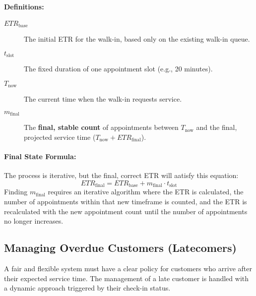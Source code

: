 \documentclass{article}
\begin{document}
\paragraph{Definitions:}
\begin{description}
    \item[$ETR_{\text{base}}$] The initial ETR for the walk-in, based only on the existing walk-in queue.
    \item[$t_{\text{slot}}$] The fixed duration of one appointment slot (e.g., 20 minutes).
    \item[$T_{\text{now}}$] The current time when the walk-in requests service.
    \item[$m_{\text{final}}$] The \textbf{final, stable count} of appointments between $T_{\text{now}}$ and the final, projected service time ($T_{\text{now}} + ETR_{\text{final}}$).
\end{description}

\paragraph{Final State Formula:}
The process is iterative, but the final, correct ETR will aatisfy this equation:
\begin{equation}
    ETR_{\text{final}} = ETR_{\text{base}} + m_{\text{final}} \cdot t_{\text{slot}}
\end{equation}
Finding $m_{\text{final}}$ requires an iterative algorithm where the ETR is calculated, the number of appointments within that new timeframe is counted, and the ETR is recalculated with the new appointment count until the number of appointments no longer increases.

\subsection{Managing Overdue Customers (Latecomers)}
A fair and flexible system must have a clear policy for customers who arrive after their expected service time. The management of a late customer is handled with a dynamic approach triggered by their check-in status.
\end{document}
